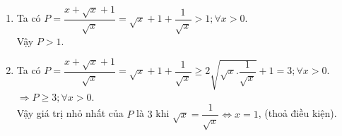 \begin{bt}
{\begin{enumerate}
				\item Ta có $P=\dfrac{x+\sqrt{x}+1}{\sqrt{x}}$$=\sqrt{x}+1+\dfrac{1}{\sqrt{x}}>1;  \forall x>0$.\\
				Vậy  $P>1$.
				
				\item Ta có $P$$=\dfrac{x+\sqrt{x}+1}{\sqrt{x}}$$=\sqrt{x}+1+\dfrac{1}{\sqrt{x}}\ge 2\sqrt{\sqrt{x}.\dfrac{1}{\sqrt{x}}}+1=3;  \forall x>0$.\\
				$\Rightarrow P\ge 3;  \forall x>0$.\\
				Vậy giá trị nhỏ nhất của $P$ là $3$ khi $\sqrt{x}=\dfrac{1}{\sqrt{x}}\Leftrightarrow x=1$, (thoả điều kiện).
				
			\end{enumerate}
		}
	\end{bt}
	
